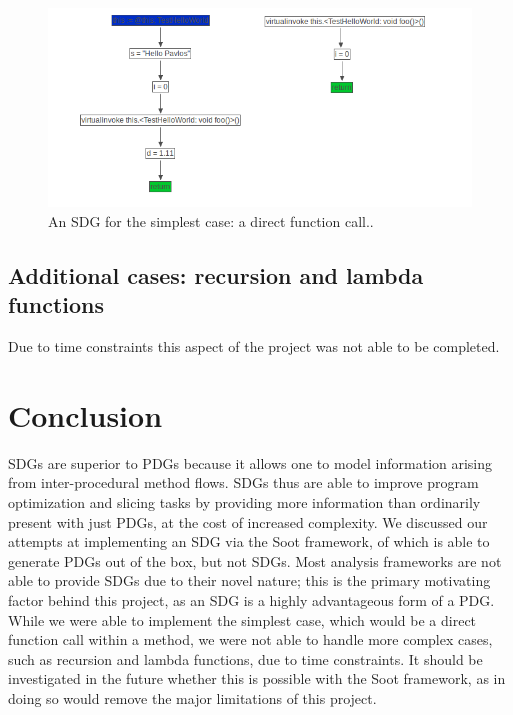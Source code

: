 \documentclass[authoryear,preprint]{sigplanconf}
\begin{document}
\begin{figure}[ht]
	\centering
	\includegraphics[width=.6\linewidth]{figures/Selection_083}
	\caption[An SDG for the simplest case: a direct function call.]{\label{f:firstImpl}An SDG for the simplest case: a direct function call..}
\end{figure}

\subsection{Additional cases: recursion and lambda functions}

Due to time constraints this aspect of the project was not able to be completed.

\section{Conclusion}

SDGs are superior to PDGs because it allows one to model information arising from inter-procedural method flows. SDGs thus are able to improve program optimization and slicing tasks by providing more information than ordinarily present with just PDGs, at the cost of increased complexity. We discussed our attempts at implementing an SDG via the Soot framework, of which is able to generate PDGs out of the box, but not SDGs. Most analysis frameworks are not able to provide SDGs due to their novel nature; this is the primary motivating factor behind this project, as an SDG is a highly advantageous form of a PDG. While we were able to implement the simplest case, which would be a direct function call within a method, we were not able to handle more complex cases, such as recursion and lambda functions, due to time constraints. It should be investigated in the future whether this is possible with the Soot framework, as in doing so would remove the major limitations of this project.






\end{document}
